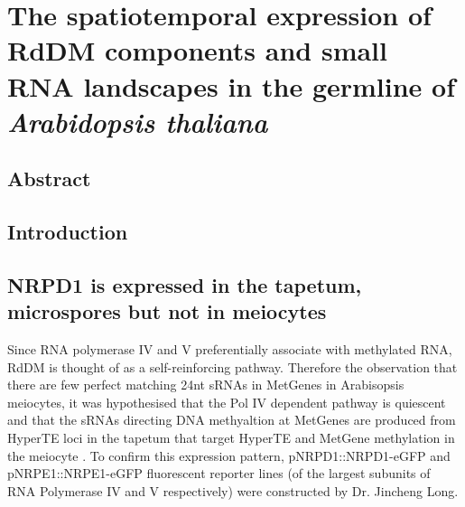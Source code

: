 
\chapter{The spatiotemporal expression of RdDM components and small RNA landscapes in the germline of \textit{Arabidopsis thaliana}}

\ifpdf
    \graphicspath{{Chapter2/Figs/Raster/}{Chapter2/Figs/PDF/}{Chapter2/Figs/}}
\else
    \graphicspath{{Chapter2/Figs/Vector/}{Chapter2/Figs/}}
\fi


\section{Abstract}



\section{Introduction}

\clearpage



\section{NRPD1 is expressed in the tapetum, microspores but not in meiocytes}

Since RNA polymerase IV and V preferentially associate with methylated RNA, RdDM is thought of as a self-reinforcing pathway. Therefore the observation that there are few perfect matching 24nt sRNAs in MetGenes in Arabisopsis meiocytes, it was hypothesised that the Pol IV dependent pathway is quiescent and that the sRNAs directing DNA methyaltion at MetGenes are produced from HyperTE loci in the tapetum that target HyperTE and MetGene methylation in the meiocyte \citep{RN199,RN187}. To confirm this expression pattern, pNRPD1::NRPD1-eGFP and pNRPE1::NRPE1-eGFP fluorescent reporter lines (of the largest subunits of RNA Polymerase IV and V respectively\citep{RN33}) were constructed by Dr. Jincheng Long.

